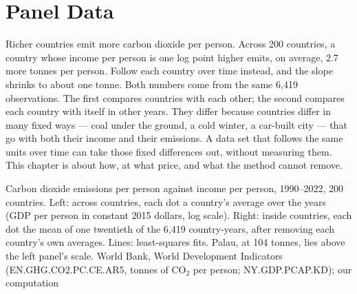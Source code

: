 \chapter{Panel Data}\label{ch:b3:panel-data}

Richer countries emit more carbon dioxide per person. Across 200 countries,
a country whose income per person is one log point higher emits, on average,
2.7 more tonnes per person. %
Follow each country over time instead, and the slope shrinks to about one
tonne. %
Both numbers come from the same 6{,}419 observations. The first compares
countries with each other; the second compares each country with itself in
other years. They differ because countries differ in many fixed ways --- coal
under the ground, a cold winter, a car-built city --- that go with both their
income and their emissions. A data set that follows the same units over time
can take those fixed differences out, without measuring them. This chapter is
about how, at what price, and what the method cannot remove.

\begin{openingchart}{Carbon dioxide emissions per person against income per
person, 1990--2022, 200 countries. Left: across countries, each dot a
country's average over the years (GDP per person in constant 2015 dollars, log
scale). Right: inside countries, each dot the mean of one twentieth of the
6{,}419 country-years, after removing each country's own averages. Lines:
least-squares fits. Palau, at 104 tonnes, lies above the left panel's scale.}%
{World Bank, World Development Indicators
(EN.GHG.CO2.PC.CE.AR5, tonnes of CO$_2$ per person; NY.GDP.PCAP.KD); our
computation}
\end{openingchart}

